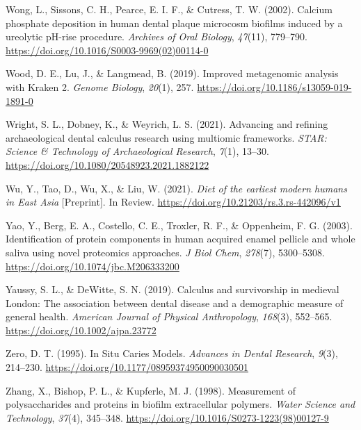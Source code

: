 \documentclass[
  letterpaper,
]{book}
\newlength{\cslhangindent}
\newlength{\cslentryspacingunit} %
\newenvironment{CSLReferences}[2] %
 {%
  \setlength{\parindent}{0pt}
  \ifodd #1
  \let\oldpar\par
  \def\par{\hangindent=\cslhangindent\oldpar}
  \fi
  \setlength{\parskip}{#2\cslentryspacingunit}
 }%
 {}
\begin{document}
\begin{CSLReferences}{1}{0}
\leavevmode{}%
Wong, L., Sissons, C. H., Pearce, E. I. F., \& Cutress, T. W. (2002).
Calcium phosphate deposition in human dental plaque microcosm biofilms
induced by a ureolytic {pH-rise} procedure. \emph{Archives of Oral
Biology}, \emph{47}(11), 779--790.
\url{https://doi.org/10.1016/S0003-9969(02)00114-0}

\leavevmode{}%
Wood, D. E., Lu, J., \& Langmead, B. (2019). Improved metagenomic
analysis with {Kraken} 2. \emph{Genome Biology}, \emph{20}(1), 257.
\url{https://doi.org/10.1186/s13059-019-1891-0}

\leavevmode{}%
Wright, S. L., Dobney, K., \& Weyrich, L. S. (2021). Advancing and
refining archaeological dental calculus research using multiomic
frameworks. \emph{STAR: Science \& Technology of Archaeological
Research}, \emph{7}(1), 13--30.
\url{https://doi.org/10.1080/20548923.2021.1882122}

\leavevmode{}%
Wu, Y., Tao, D., Wu, X., \& Liu, W. (2021). \emph{Diet of the earliest
modern humans in {East Asia}} {[}Preprint{]}. {In Review}.
\url{https://doi.org/10.21203/rs.3.rs-442096/v1}

\leavevmode{}%
Yao, Y., Berg, E. A., Costello, C. E., Troxler, R. F., \& Oppenheim, F.
G. (2003). Identification of protein components in human acquired enamel
pellicle and whole saliva using novel proteomics approaches. \emph{J
Biol Chem}, \emph{278}(7), 5300--5308.
\url{https://doi.org/10.1074/jbc.M206333200}

\leavevmode{}%
Yaussy, S. L., \& DeWitte, S. N. (2019). Calculus and survivorship in
medieval {London}: {The} association between dental disease and a
demographic measure of general health. \emph{American Journal of
Physical Anthropology}, \emph{168}(3), 552--565.
\url{https://doi.org/10.1002/ajpa.23772}

\leavevmode{}%
Zero, D. T. (1995). In {Situ Caries Models}. \emph{Advances in Dental
Research}, \emph{9}(3), 214--230.
\url{https://doi.org/10.1177/08959374950090030501}

\leavevmode{}%
Zhang, X., Bishop, P. L., \& Kupferle, M. J. (1998). Measurement of
polysaccharides and proteins in biofilm extracellular polymers.
\emph{Water Science and Technology}, \emph{37}(4), 345--348.
\url{https://doi.org/10.1016/S0273-1223(98)00127-9}


\end{CSLReferences}
\end{document}
